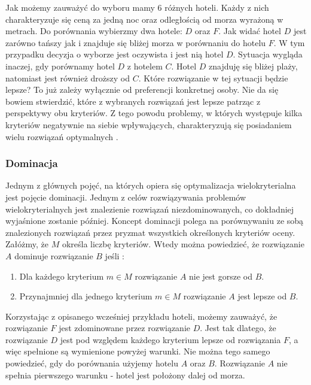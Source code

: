 \documentclass[twoside]{iisthesis}
\begin{document}
Jak możemy zauważyć do wyboru mamy 6 różnych hoteli. Każdy z nich charakteryzuje się ceną za jedną noc oraz odległością od morza wyrażoną w metrach. Do porównania wybierzmy dwa hotele: $D$ oraz $F$. Jak widać hotel $D$ jest zarówno tańszy jak i znajduje się bliżej morza w porównaniu do hotelu $F$. W tym przypadku decyzja o wyborze jest oczywista i jest nią hotel $D$. Sytuacja wygląda inaczej, gdy porównamy hotel $D$ z hotelem $C$. Hotel $D$ znajduję się bliżej plaży, natomiast jest również droższy od $C$. Które rozwiązanie w tej sytuacji będzie lepsze? To już zależy wyłącznie od preferencji konkretnej osoby. Nie da się bowiem stwierdzić, które z wybranych rozwiązań jest lepsze patrząc z perspektywy obu kryteriów. Z tego powodu problemy, w których występuje kilka kryteriów negatywnie na siebie wpływających, charakteryzują się posiadaniem wielu rozwiązań optymalnych \cite{book_ergot}.

\subsubsection{Dominacja}
Jednym z głównych pojęć, na których opiera się optymalizacja wielokryterialna jest pojęcie dominacji. Jednym z celów rozwiązywania problemów wielokryterialnych jest znalezienie rozwiązań niezdominowanych, co dokładniej wyjaśnione zostanie później. Koncept dominacji polega na porównywaniu ze sobą znalezionych rozwiązań przez pryzmat wszystkich określonych kryteriów oceny. Załóżmy, że $M$ określa liczbę kryteriów. Wtedy można powiedzieć, że rozwiązanie $A$ dominuje rozwiązanie $B$ jeśli \cite{book}:\\
\begin{enumerate}
	\item Dla każdego kryterium $m \in M$ rozwiązanie $A$ nie jest gorsze od $B$.
	\item Przynajmniej dla jednego kryterium $m \in M$ rozwiązanie $A$ jest lepsze od $B$.\\
\end{enumerate}
Korzystając z opisanego wcześniej przykładu hoteli, możemy zauważyć, że rozwiązanie $F$ jest zdominowane przez rozwiązanie $D$. Jest tak dlatego, że rozwiązanie $D$ jest pod względem każdego kryterium lepsze od rozwiązania $F$, a więc spełnione są wymienione powyżej warunki. Nie można tego samego powiedzieć, gdy do porównania użyjemy hotelu $A$ oraz $B$. Rozwiązanie $A$ nie spełnia pierwszego warunku - hotel jest położony dalej od morza.
\end{document}
